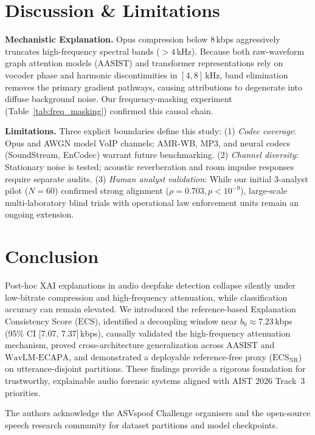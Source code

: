 \documentclass[runningheads]{llncs}
\newcommand{\ecs}{\ensuremath{\mathrm{ECS}}}
\newcommand{\ecsnr}{\ensuremath{\mathrm{ECS}_{\mathrm{NR}}}}
\newcommand{\aasist}{\ensuremath{\mathrm{AASIST}}}
\newcommand{\wavlm}{\ensuremath{\mathrm{WavLM}\text{-}\mathrm{ECAPA}}}
\begin{document}
\section{Discussion \& Limitations}
\label{sec:discussion}

\textbf{Mechanistic Explanation.}
Opus compression below 8\,kbps aggressively truncates high-frequency spectral bands ($>4$\,kHz).
Because both raw-waveform graph attention models (\aasist{}) and transformer representations rely on vocoder phase and harmonic discontinuities in $[4, 8]$\,kHz, band elimination removes the primary gradient pathways, causing attributions to degenerate into diffuse background noise.
Our frequency-masking experiment (Table~\ref{tab:freq_masking}) confirmed this causal chain.

\textbf{Limitations.}
Three explicit boundaries define this study:
(1) \emph{Codec coverage}: Opus and AWGN model VoIP channels; AMR-WB, MP3, and neural codecs (SoundStream, EnCodec) warrant future benchmarking.
(2) \emph{Channel diversity}: Stationary noise is tested; acoustic reverberation and room impulse responses require separate audits.
(3) \emph{Human analyst validation}: While our initial 3-analyst pilot ($N=60$) confirmed strong alignment ($\rho = 0.703, p < 10^{-9}$), large-scale multi-laboratory blind trials with operational law enforcement units remain an ongoing extension.

\section{Conclusion}
\label{sec:conclusion}

Post-hoc XAI explanations in audio deepfake detection collapse silently under low-bitrate compression and high-frequency attenuation, while classification accuracy can remain elevated.
We introduced the reference-based Explanation Consistency Score (\ecs{}), identified a decoupling window near $b_0 \approx 7.23$\,kbps (95\% CI [7.07, 7.37]\,kbps), causally validated the high-frequency attenuation mechanism, proved cross-architecture generalization across \aasist{} and \wavlm{}, and demonstrated a deployable reference-free proxy (\ecsnr{}) on utterance-disjoint partitions.
These findings provide a rigorous foundation for trustworthy, explainable audio forensic systems aligned with AIST 2026 Track~3 priorities.

\begin{acknowledgements}
The authors acknowledge the ASVspoof Challenge organisers and the open-source speech research community for dataset partitions and model checkpoints.
\end{acknowledgements}



\end{document}

